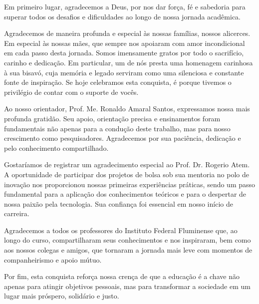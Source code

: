 \begin{agradecimentos}

Em primeiro lugar, agradecemos a Deus, por nos dar força, fé e sabedoria para superar todos os desafios e dificuldades ao longo de nossa jornada acadêmica.

Agradecemos de maneira profunda e especial às nossas famílias, nossos alicerces. Em especial às nossas mães, que sempre nos apoiaram com amor incondicional em cada passo desta jornada. Somos imensamente gratos por todo o sacrifício, carinho e dedicação. Em particular, um de nós presta uma homenagem carinhosa à sua bisavó, cuja memória e legado serviram como uma silenciosa e constante fonte de inspiração. Se hoje celebramos esta conquista, é porque tivemos o privilégio de contar com o suporte de vocês.

Ao nosso orientador, Prof. Me. Ronaldo Amaral Santos, expressamos nossa mais profunda gratidão. Seu apoio, orientação precisa e ensinamentos foram fundamentais não apenas para a condução deste trabalho, mas para nosso crescimento como pesquisadores. Agradecemos por sua paciência, dedicação e pelo conhecimento compartilhado.

Gostaríamos de registrar um agradecimento especial ao Prof. Dr. Rogerio Atem. A oportunidade de participar dos projetos de bolsa sob sua mentoria no polo de inovação nos proporcionou nossas primeiras experiências práticas, sendo um passo fundamental para a aplicação dos conhecimentos teóricos e para o despertar de nossa paixão pela tecnologia. Sua confiança foi essencial em nosso início de carreira.

Agradecemos a todos os professores do Instituto Federal Fluminense que, ao longo do curso, compartilharam seus conhecimentos e nos inspiraram, bem como aos nossos colegas e amigos, que tornaram a jornada mais leve com momentos de companheirismo e apoio mútuo.

Por fim, esta conquista reforça nossa crença de que a educação é a chave não apenas para atingir objetivos pessoais, mas para transformar a sociedade em um lugar mais próspero, solidário e justo.

\end{agradecimentos}